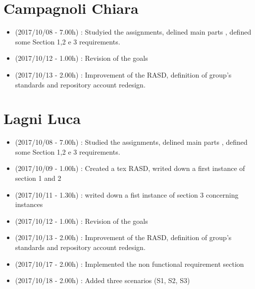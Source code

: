 \documentclass[a4paper,leqno]{book}
\begin{document}
\section{Campagnoli Chiara}
\begin{itemize}
\item (2017/10/08 - 7.00h) : Studyied the assignments, delined main parts , defined some Section 1,2 e 3 requirements.
\item (2017/10/12 - 1.00h) : Revision of the goals 
\item (2017/10/13 - 2.00h) : Improvement of the RASD, definition of group's standards and repository account redesign.
\end{itemize}

\section{Lagni Luca}
\begin{itemize}
\item (2017/10/08 - 7.00h) : Studied the assignments, delined main parts , defined some Section 1,2 e 3 requirements.
\item (2017/10/09 - 1.00h) : Created a tex RASD, writed down a first instance of section 1 and 2
\item (2017/10/11 - 1.30h) : writed down a fist instance of section 3 concerning instances
\item (2017/10/12 - 1.00h) : Revision of the goals 
\item (2017/10/13 - 2.00h) : Improvement of the RASD, definition of group's standards and repository account redesign.
\item (2017/10/17 - 2.00h) : Implemented the non functional requirement section
\item (2017/10/18 - 2.00h) : Added three scenarios (S1, S2, S3)
\end{itemize}
\end{document}
